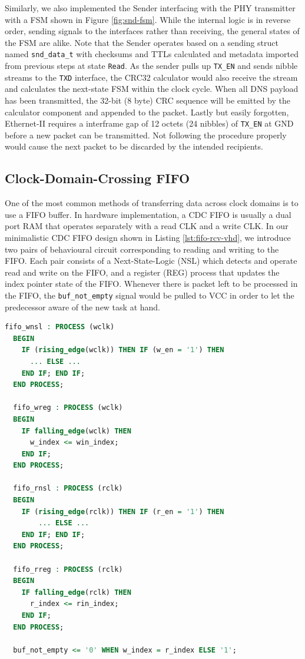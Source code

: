\documentclass[a4paper]{report}
\newcommand{\code}{\texttt}
\begin{document}
Similarly, we also implemented the Sender interfacing with the PHY transmitter with a FSM shown in Figure \ref{fig:snd-fsm}. While the internal logic is in reverse order, sending signals to the interfaces rather than receiving, the general states of the FSM are alike. Note that the Sender operates based on a sending struct named \code{snd\_data\_t} with checksums and TTLs calculated and metadata imported from previous steps at state \code{Read}. As the sender pulls up \code{TX\_EN} and sends nibble streams to the \code{TXD} interface, the CRC32 calculator would also receive the stream and calculates the next-state FSM within the clock cycle. When all DNS payload has been transmitted, the 32-bit (8 byte) CRC sequence will be emitted by the calculator component and appended to the packet. Lastly but easily forgotten, Ethernet-II requires a interframe gap of 12 octets (24 nibbles) of \code{TX\_EN} at GND before a new packet can be transmitted. Not following the procedure properly would cause the next packet to be discarded by the intended recipients.

\subsection{Clock-Domain-Crossing FIFO}

One of the most common methods of transferring data across clock domains is to use a FIFO buffer. In hardware implementation, a CDC FIFO is usually a dual port RAM that operates separately with a read CLK and a write CLK. In our minimalistic CDC FIFO design shown in Listing \ref{lst:fifo-rcv-vhd}, we introduce two pairs of behavioural circuit corresponding to reading and writing to the FIFO. Each pair consists of a Next-State-Logic (NSL) which detects and operate read and write on the FIFO, and a register (REG) process that updates the index pointer state of the FIFO. Whenever there is packet left to be processed in the FIFO, the \code{buf\_not\_empty} signal would be pulled to VCC in order to let the predecessor aware of the new task at hand.

\begin{lstlisting}[language=VHDL, caption=Snippet of FIFO \code{FIFO\_receive.vhd}, label={lst:fifo-rcv-vhd}]
  fifo_wnsl : PROCESS (wclk)
  BEGIN
    IF (rising_edge(wclk)) THEN IF (w_en = '1') THEN
      ... ELSE ...
    END IF; END IF;
  END PROCESS;

  fifo_wreg : PROCESS (wclk)
  BEGIN
    IF falling_edge(wclk) THEN
      w_index <= win_index;
    END IF;
  END PROCESS;

  fifo_rnsl : PROCESS (rclk)
  BEGIN
    IF (rising_edge(rclk)) THEN IF (r_en = '1') THEN
        ... ELSE ...
    END IF; END IF;
  END PROCESS;

  fifo_rreg : PROCESS (rclk)
  BEGIN
    IF falling_edge(rclk) THEN
      r_index <= rin_index;
    END IF;
  END PROCESS;

  buf_not_empty <= '0' WHEN w_index = r_index ELSE '1';
\end{lstlisting}
\end{document}
